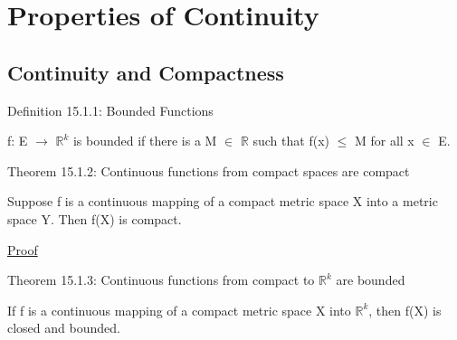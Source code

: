 \newpage

\section[Day 15: Continuity Properties]{Properties of Continuity}

\subsection{ Continuity and Compactness }

{ \color{blue} Definition 15.1.1: Bounded Functions }

    \begin{adjustbox}{minipage=14cm, right, vspace=0.1cm 0cm}
        f: E $\rightarrow$ $\mathbb{R}^k$ is bounded if there is a
        M $\in$ $\mathbb{R}$ such that f(x) $\leq$ M for all x $\in$ E.
    \end{adjustbox}

    \vspace{0.5cm}

{ \color{red} Theorem 15.1.2:
Continuous functions from compact spaces are compact }

    \begin{adjustbox}{minipage=14cm, right, vspace=0.1cm 0cm}
        Suppose f is a continuous mapping of a compact metric space X
        into a metric space Y. Then f(X) is compact.
    \end{adjustbox}

{ \color{magenta} \underline{Proof} }


    \vspace{0.5cm}

{ \color{red} Theorem 15.1.3:
Continuous functions from compact to $\mathbb{R}^k$ are bounded }

    \begin{adjustbox}{minipage=14cm, right, vspace=0.1cm 0cm}
        If f is a continuous mapping of a compact metric space X into $\mathbb{R}^k$,
        then f(X) is closed and bounded. 
    \end{adjustbox}

